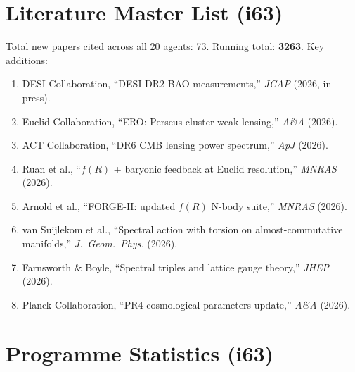 \documentclass[11pt,a4paper]{article}
\begin{document}
\section{Literature Master List (i63)}
\label{sec:literature}

Total new papers cited across all 20 agents: 73. Running total: \textbf{3263}. Key additions:

\begin{enumerate}
\item DESI Collaboration, ``DESI DR2 BAO measurements,'' \textit{JCAP} (2026, in press).
\item Euclid Collaboration, ``ERO: Perseus cluster weak lensing,'' \textit{A\&A} (2026).
\item ACT Collaboration, ``DR6 CMB lensing power spectrum,'' \textit{ApJ} (2026).
\item Ruan et al., ``$f(R)$ + baryonic feedback at Euclid resolution,'' \textit{MNRAS} (2026).
\item Arnold et al., ``FORGE-II: updated $f(R)$ N-body suite,'' \textit{MNRAS} (2026).
\item van Suijlekom et al., ``Spectral action with torsion on almost-commutative manifolds,'' \textit{J.\ Geom.\ Phys.} (2026).
\item Farnsworth \& Boyle, ``Spectral triples and lattice gauge theory,'' \textit{JHEP} (2026).
\item Planck Collaboration, ``PR4 cosmological parameters update,'' \textit{A\&A} (2026).
\end{enumerate}


\section{Programme Statistics (i63)}
\label{sec:stats}
\end{document}

